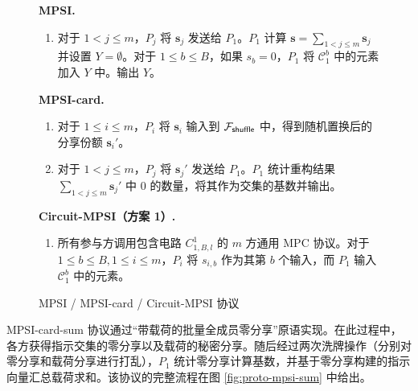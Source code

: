 \begin{figure}[!htb]
\begin{framed}
\begin{minipage}[c]{\textwidth}
\begin{trivlist}
    \item \textbf{MPSI.} 
    \begin{enumerate}[itemsep=2pt,topsep=0pt,parsep=0pt,leftmargin=15pt] \addtocounter{enumi}{2}
        \item 对于 $1 < j  \le m$，$P_j$ 将 $\textbf{s}_j$ 发送给 $P_1$。$P_1$ 计算 $\textbf{s} = \sum_{1 < j  \le m} \textbf{s}_j$ 并设置 $Y = \emptyset$。对于 $1 \le b \le B$，如果 $s_b = 0$，$P_1$ 将 $\mathcal{C}_1^b$ 中的元素加入 $Y$ 中。输出 $Y$。
    \end{enumerate}
    \item \textbf{MPSI-card.} 
    \begin{enumerate}[itemsep=2pt,topsep=0pt,parsep=0pt,leftmargin=15pt] \addtocounter{enumi}{2}
        \item 对于 $1 \le i \le m$，$P_i$ 将 $\textbf{s}_i$ 输入到 $\mathcal{F}_\mathsf{shuffle}$ 中，得到随机置换后的分享份额 $\textbf{s}_{i}'$。
        \item 对于 $1 < j  \le m$，$P_j$ 将 $\textbf{s}_j'$ 发送给 $P_1$。$P_1$ 统计重构结果 $\sum_{1 < j  \le m} \textbf{s}_j'$ 中 0 的数量，将其作为交集的基数并输出。
    \end{enumerate}
    \item \textbf{Circuit-MPSI（方案 1）.}
    \begin{enumerate}[itemsep=2pt,topsep=0pt,parsep=0pt,leftmargin=15pt] \addtocounter{enumi}{2}
        \item 所有参与方调用包含电路 $C_{1,B,l}^1$ 的 $m$ 方通用 MPC 协议。对于 $1 \le b \le B, 1 \le i \le m$，$P_i$ 将 $s_{i,b}$ 作为其第 $b$ 个输入，而 $P_1$ 输入 $\mathcal{C}_1^b$ 中的元素。
    \end{enumerate}
\end{trivlist}
\end{minipage}
\end{framed}
\caption{MPSI / MPSI-card / Circuit-MPSI 协议}\label{fig:proto-mpsi}
\end{figure} 

MPSI-card-sum 协议通过“带载荷的批量全成员零分享”原语实现。在此过程中，各方获得指示交集的零分享以及载荷的秘密分享。随后经过两次洗牌操作（分别对零分享和载荷分享进行打乱），$P_1$ 统计零分享计算基数，并基于零分享构建的指示向量汇总载荷求和。该协议的完整流程在图 \ref{fig:proto-mpsi-sum} 中给出。

